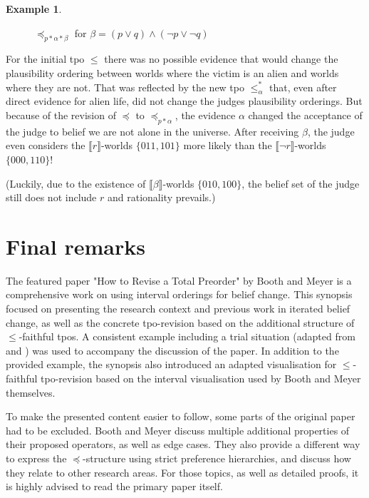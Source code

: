 \documentclass[english, 12pt]{scrartcl}
\theoremstyle{definition}
\newtheorem{example}{Example}
\theoremstyle{definition}
\theoremstyle{definition}
\newcommand{\modelsOf}[1]{\llbracket #1 \rrbracket}
\begin{document}
\begin{example}
\begin{figure}[H]
            \caption{$\preceq_{p \ast \alpha \ast \beta}$ for $\beta = (p \vee q) \wedge (\neg p \vee \neg q)$}
            \label{fig:example-preceq-revised-alien2}
    \end{figure}
    
For the initial tpo $\leq$ there was no possible evidence that would change the plausibility ordering between worlds where the victim is an alien and worlds where they are not. That was reflected by the new tpo $\leq_{\alpha}^{\ast}$ that, even after direct evidence for alien life, did not change the judges plausibility orderings. But because of the revision of $\preceq$ to $\preceq_{p \ast \alpha}$, the evidence $\alpha$ changed the acceptance of the judge to belief we are not alone in the universe. After receiving $\beta$, the judge even considers the $\modelsOf{r}$-worlds $\{011, 101\}$ more likely than the $\modelsOf{\neg r}$-worlds $\{000, 110\}$!

(Luckily, due to the existence of $\modelsOf{\beta}$-worlds $\{010, 100\}$, the belief set of the judge still does not include $r$ and rationality prevails.)
\end{example}

\section{Final remarks}
\label{section:conclusion}
The featured paper "How to Revise a Total Preorder" by Booth and Meyer \cite{Booth2011} is a comprehensive work on using interval orderings for belief change. This synopsis focused on presenting the research context and previous work in iterated belief change, as well as the concrete tpo-revision based on the additional structure of $\leq$-faithful tpos. A consistent example including a trial situation (adapted from \cite{Darwiche1997} and \cite{Booth2011}) was used to accompany the discussion of the paper. In addition to the provided example, the synopsis also introduced an adapted visualisation for $\leq$-faithful tpo-revision based on the interval visualisation used by Booth and Meyer themselves.

To make the presented content easier to follow, some parts of the original paper had to be excluded. Booth and Meyer discuss multiple additional properties of their proposed operators, as well as edge cases. They also provide a different way to express the $\preceq$-structure using strict preference hierarchies, and discuss how they relate to other research areas. For those topics, as well as detailed proofs, it is highly advised to read the primary paper \cite{Booth2011} itself.
\end{document}
